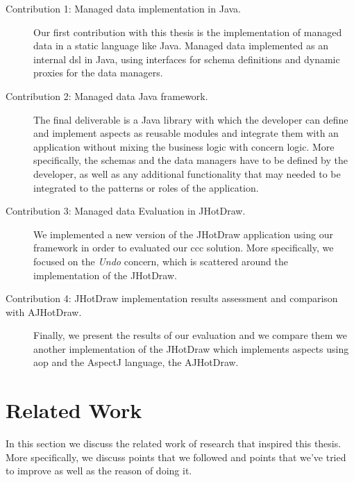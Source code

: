 \begin{description}
  \item[Contribution 1: Managed data implementation in Java.]
  Our first contribution with this thesis is the implementation of managed data in a static language like Java.
  Managed data implemented as an internal \ac{dsl} in Java, using interfaces for schema definitions and dynamic proxies
  for the data managers.

  \item[Contribution 2: Managed data Java framework.]
  The final deliverable is a Java library with which the developer can define and implement aspects as reusable modules
and integrate them with an application without mixing the business logic with concern logic.
More specifically, the schemas and the data managers have to be defined by the developer, as well as any additional
functionality that may needed to be integrated to the patterns or roles of the application.

  \item[Contribution 3: Managed data Evaluation in JHotDraw.]
  We implemented a new version of the JHotDraw application using our framework in order to evaluated our \ac{ccc} solution.
  More specifically, we focused on the \textit{Undo} concern, which is scattered around the implementation of the JHotDraw.

  \item[Contribution 4: JHotDraw implementation results assessment and comparison with AJHotDraw.]
  Finally, we present the results of our evaluation and we compare them we another implementation of the JHotDraw which 
  implements aspects using \ac{aop} and the AspectJ language, the AJHotDraw.

\end{description}

\section{Related Work}\label{Related Work}
In this section we discuss the related work of research that inspired this thesis. 
More specifically, we discuss points that we followed and points that we've tried to improve as well as the reason of doing it.

